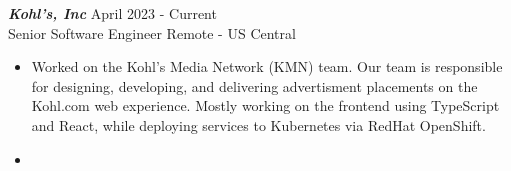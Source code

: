 {\sl \textbf{Kohl's, Inc}} \hfill April 2023 - Current \\ Senior Software Engineer \hfill Remote - US Central
\begin{itemize}
    \item Worked on the Kohl's Media Network (KMN) team. Our team is responsible for designing, developing, and delivering advertisment placements on the Kohl.com web experience. Mostly working on the frontend using TypeScript and React, while deploying services to Kubernetes via RedHat OpenShift.
    \item 
\end{itemize}